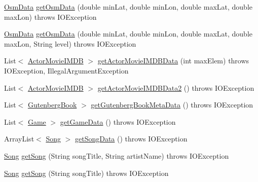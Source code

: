 \begin{DoxyCompactItemize}
\hyperlink{classbridges_1_1data__src__dependent_1_1_osm_data}{Osm\+Data} \hyperlink{classbridges_1_1connect_1_1_data_source_a1448b538c2453c922ca24e35c16f9afe}{get\+Osm\+Data} (double min\+Lat, double min\+Lon, double max\+Lat, double max\+Lon)  throws I\+O\+Exception 
\item 
\hyperlink{classbridges_1_1data__src__dependent_1_1_osm_data}{Osm\+Data} \hyperlink{classbridges_1_1connect_1_1_data_source_a3ad97225ea5160ba8d38160a7ae69813}{get\+Osm\+Data} (double min\+Lat, double min\+Lon, double max\+Lat, double max\+Lon, String level)  throws I\+O\+Exception 
\item 
List$<$ \hyperlink{classbridges_1_1data__src__dependent_1_1_actor_movie_i_m_d_b}{Actor\+Movie\+I\+M\+DB} $>$ \hyperlink{classbridges_1_1connect_1_1_data_source_ab18803b850f3c867306723d1a1be337e}{get\+Actor\+Movie\+I\+M\+D\+B\+Data} (int max\+Elem)  throws I\+O\+Exception, Illegal\+Argument\+Exception 
\item 
List$<$ \hyperlink{classbridges_1_1data__src__dependent_1_1_actor_movie_i_m_d_b}{Actor\+Movie\+I\+M\+DB} $>$ \hyperlink{classbridges_1_1connect_1_1_data_source_ae44e4ed7879e2755f8c66a335d8b6ad5}{get\+Actor\+Movie\+I\+M\+D\+B\+Data2} ()  throws I\+O\+Exception 
\item 
List$<$ \hyperlink{classbridges_1_1data__src__dependent_1_1_gutenberg_book}{Gutenberg\+Book} $>$ \hyperlink{classbridges_1_1connect_1_1_data_source_aff3adc9d08624062469315f2fe059044}{get\+Gutenberg\+Book\+Meta\+Data} ()  throws I\+O\+Exception 
\item 
List$<$ \hyperlink{classbridges_1_1data__src__dependent_1_1_game}{Game} $>$ \hyperlink{classbridges_1_1connect_1_1_data_source_ab3744c6b103281724bdd832da0924312}{get\+Game\+Data} ()  throws I\+O\+Exception 
\item 
Array\+List$<$ \hyperlink{classbridges_1_1data__src__dependent_1_1_song}{Song} $>$ \hyperlink{classbridges_1_1connect_1_1_data_source_aeccb689aeacc094b0621ab5564849fa6}{get\+Song\+Data} ()  throws I\+O\+Exception 
\item 
\hyperlink{classbridges_1_1data__src__dependent_1_1_song}{Song} \hyperlink{classbridges_1_1connect_1_1_data_source_a935ea2005b7de3cb22c1e55027b81460}{get\+Song} (String song\+Title, String artist\+Name)  throws I\+O\+Exception 
\item 
\hyperlink{classbridges_1_1data__src__dependent_1_1_song}{Song} \hyperlink{classbridges_1_1connect_1_1_data_source_a4f49b088703c74d68bd854d40edc5ad4}{get\+Song} (String song\+Title)  throws I\+O\+Exception 
\item 

\end{DoxyCompactItemize}
